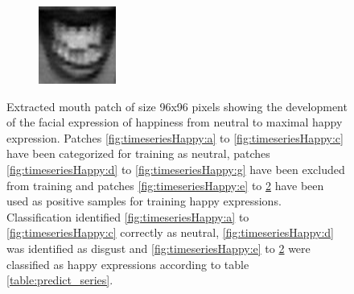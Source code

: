 \begin{figure}
\begin{subfigure}[b]{0.15\textwidth}
		\caption{}
		\label{fig:timeseriesHappy:l}
	\end{subfigure}
	\begin{subfigure}[b]{0.15\textwidth}
		\includegraphics[width=\textwidth]{./img/timeseriesHappy/S026_006_00000013.png}
		\caption{}
		\label{fig:timeseriesHappy:m}
	\end{subfigure}
	\caption[Complete time series of happy mouth patches]{Extracted mouth patch of size 96x96 pixels showing the development of
	the facial expression of happiness from neutral to maximal happy expression.
	Patches \ref{fig:timeseriesHappy:a} to \ref{fig:timeseriesHappy:c} have been
	categorized for training as neutral, patches \ref{fig:timeseriesHappy:d} to
	\ref{fig:timeseriesHappy:g} have been excluded from training and patches
	\ref{fig:timeseriesHappy:e} to \ref{fig:timeseriesHappy:m} have been used as
	positive samples for training happy expressions. Classification identified
	\ref{fig:timeseriesHappy:a} to \ref{fig:timeseriesHappy:c} correctly as
	neutral, \ref{fig:timeseriesHappy:d} was identified as disgust and
	\ref{fig:timeseriesHappy:e} to \ref{fig:timeseriesHappy:m} were classified as
	happy expressions according to table \ref{table:predict_series}.}
	\label{fig:timeseriesHappy}
\end{figure}


